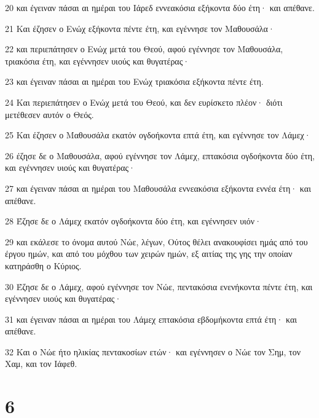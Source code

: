 \par 20 και έγειναν πάσαι αι ημέραι του Ιάρεδ εννεακόσια εξήκοντα δύο έτη· και απέθανε.
\par 21 Και έζησεν ο Ενώχ εξήκοντα πέντε έτη, και εγέννησε τον Μαθουσάλα·
\par 22 και περιεπάτησεν ο Ενώχ μετά του Θεού, αφού εγέννησε τον Μαθουσάλα, τριακόσια έτη, και εγέννησεν υιούς και θυγατέρας·
\par 23 και έγειναν πάσαι αι ημέραι του Ενώχ τριακόσια εξήκοντα πέντε έτη.
\par 24 Και περιεπάτησεν ο Ενώχ μετά του Θεού, και δεν ευρίσκετο πλέον· διότι μετέθεσεν αυτόν ο Θεός.
\par 25 Και έζησεν ο Μαθουσάλα εκατόν ογδοήκοντα επτά έτη, και εγέννησε τον Λάμεχ·
\par 26 έζησε δε ο Μαθουσάλα, αφού εγέννησε τον Λάμεχ, επτακόσια ογδοήκοντα δύο έτη, και εγέννησεν υιούς και θυγατέρας·
\par 27 και έγειναν πάσαι αι ημέραι του Μαθουσάλα εννεακόσια εξήκοντα εννέα έτη· και απέθανε.
\par 28 Έζησε δε ο Λάμεχ εκατόν ογδοήκοντα δύο έτη, και εγέννησεν υιόν·
\par 29 και εκάλεσε το όνομα αυτού Νώε, λέγων, Ούτος θέλει ανακουφίσει ημάς από του έργου ημών, και από του μόχθου των χειρών ημών, εξ αιτίας της γης την οποίαν κατηράσθη ο Κύριος.
\par 30 Έζησε δε ο Λάμεχ, αφού εγέννησε τον Νώε, πεντακόσια ενενήκοντα πέντε έτη, και εγέννησεν υιούς και θυγατέρας·
\par 31 και έγειναν πάσαι αι ημέραι του Λάμεχ επτακόσια εβδομήκοντα επτά έτη· και απέθανε.
\par 32 Και ο Νώε ήτο ηλικίας πεντακοσίων ετών· και εγέννησεν ο Νώε τον Σημ, τον Χαμ, και τον Ιάφεθ.

\chapter{6}

